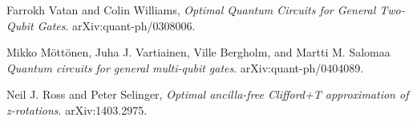 \documentclass{article}
\theoremstyle{definition}
\theoremstyle{theorem}
\theoremstyle{remark}
\begin{document}
\begin{thebibliography}{9}

 Farrokh Vatan and Colin Williams, \emph{Optimal Quantum Circuits for General Two-Qubit Gates}. arXiv:quant-ph/0308006.

 Mikko M\"ott\"onen, Juha J. Vartiainen, Ville Bergholm, and Martti M. Salomaa \emph{Quantum circuits for general multi-qubit gates}. arXiv:quant-ph/0404089.

 Neil J. Ross and Peter Selinger, \emph{Optimal ancilla-free Clifford+T approximation of z-rotations}. arXiv:1403.2975.

\end{thebibliography}
\end{document}
